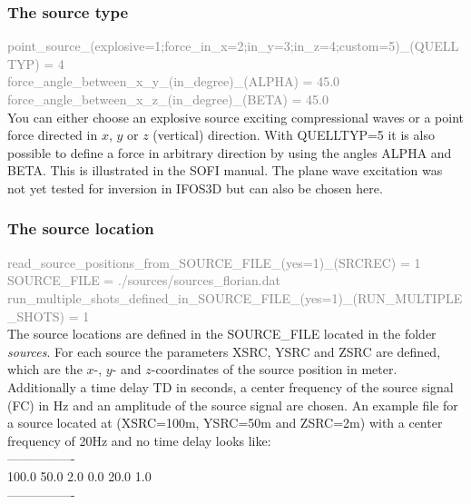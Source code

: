 \subsubsection*{The source type}
\textcolor {Gray}{point\_source\_(explosive=1;force\_in\_x=2;in\_y=3;in\_z=4;custom=5)\_(QUELLTYP) = 4\\
force\_angle\_between\_x\_y\_(in\_degree)\_(ALPHA) = 45.0\\
force\_angle\_between\_x\_z\_(in\_degree)\_(BETA) =  45.0}\vspace{0.1cm}\\
You can either choose an explosive source exciting compressional waves or a  point force directed in $x$, $y$ or $z$ (vertical) direction. With QUELLTYP=5 it is also possible to define a force in arbitrary direction by using the angles ALPHA and BETA. This is illustrated in the SOFI manual. The plane wave excitation was not yet tested for inversion in IFOS3D but can also be chosen here.
\subsubsection*{The source location}
\textcolor {Gray}{read\_source\_positions\_from\_SOURCE\_FILE\_(yes=1)\_(SRCREC) = 1\\
SOURCE\_FILE = ./sources/sources\_florian.dat  \\
run\_multiple\_shots\_defined\_in\_SOURCE\_FILE\_(yes=1)\_(RUN\_MULTIPLE\_SHOTS) = 1}\vspace{0.1cm}\\
The source locations are defined in the SOURCE\_FILE located in the folder \textit{sources}. For each source the parameters XSRC, YSRC and ZSRC are defined, which are the $x$-, $y$- and $z$-coordinates of the source position in meter. Additionally a time delay TD in seconds, a center frequency of the source signal (FC) in Hz and an amplitude of the source signal are chosen. An example file for a source located at (XSRC=100m, YSRC=50m and ZSRC=2m) with a center frequency of 20Hz and no time delay looks like:\\
----------------\\
100.0 \hspace{0.2cm} 50.0 \hspace{0.2cm} 2.0 \hspace{0.2cm} 0.0 \hspace{0.2cm} 20.0 \hspace{0.2cm} 1.0\\
----------------
